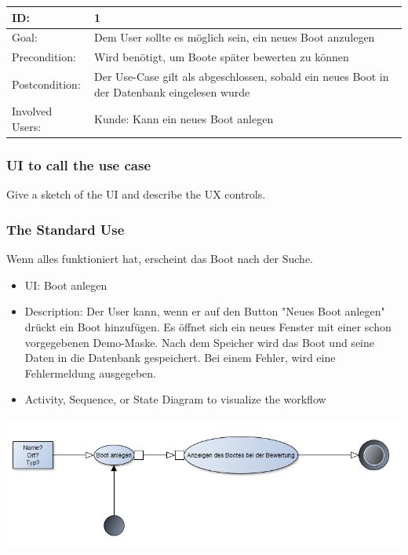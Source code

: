 \documentclass[12pt]{article}
\theoremstyle{definition}
\begin{document}
\begin{tabular}{|p{.2\linewidth}|p{.65\linewidth}|}
\hline 
ID: & 1 \\ \hline
Goal: & Dem User sollte es möglich sein, ein neues Boot anzulegen \\ \hline
Precondition: & Wird benötigt, um Boote später bewerten zu können \\ \hline
Postcondition: & Der Use-Case gilt als abgeschlossen, sobald ein neues Boot in der Datenbank eingelesen wurde\\ \hline
Involved Users: &Kunde: Kann ein neues Boot anlegen \\ \hline
\end{tabular}

\subsubsection{UI to call the use case}
Give a sketch of the UI and describe the UX controls.

\subsubsection{The Standard Use}
Wenn alles funktioniert hat, erscheint das Boot nach der Suche.
\begin{itemize}
	\item UI: Boot anlegen
	\item Description: Der User kann, wenn er auf den Button "Neues Boot anlegen" drückt ein Boot hinzufügen. Es öffnet sich ein neues Fenster mit einer schon vorgegebenen Demo-Maske. 
	Nach dem Speicher wird das Boot und seine Daten in die Datenbank gespeichert. Bei einem Fehler, wird eine Fehlermeldung ausgegeben.
	\item Activity, Sequence, or State Diagram to visualize the workflow
\end{itemize}
\includegraphics[height=0.40\textwidth]{Boot_anlegen.PNG}
\end{document}
